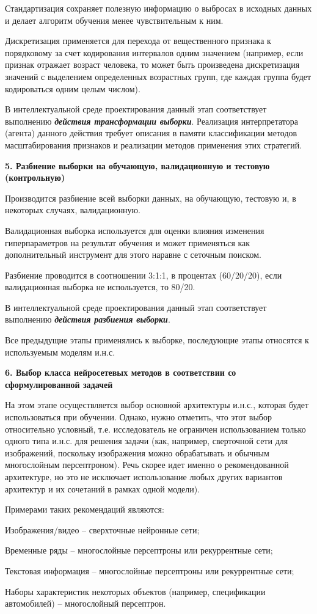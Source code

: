 Стандартизация сохраняет полезную информацию о выбросах в исходных данных и делает алгоритм обучения менее чувствительным к ним.

Дискретизация применяется для перехода от вещественного признака к порядковому за счет кодирования интервалов одним значением (например, если признак отражает возраст человека, то может быть произведена дискретизация значений с выделением определенных возрастных групп, где каждая группа будет кодироваться одним целым числом).

В интеллектуальной среде проектирования данный этап соответствует выполнению \textbf{\textit{действия трансформации выборки}}. Реализация интерпретатора (агента) данного действия требует описания в памяти классификации методов масштабирования признаков и реализации методов применения этих стратегий.


\textbf{5. Разбиение выборки на обучающую, валидационную и тестовую (контрольную)}

Производится разбиение всей выборки данных, на обучающую, тестовую и, в некоторых случаях, валидационную.

Валидационная выборка используется для оценки влияния изменения гиперпараметров на результат обучения и может применяться как дополнительный инструмент для этого наравне с сеточным поиском.

Разбиение проводится в соотношении 3:1:1, в процентах (60/20/20), если валидационная выборка не используется, то 80/20.

В интеллектуальной среде проектирования данный этап соответствует выполнению \textbf{\textit{действия разбиения выборки}}.

Все предыдущие этапы применялись к выборке, последующие этапы относятся к используемым моделям и.н.с.


\textbf{6. Выбор класса нейросетевых методов в соответствии со сформулированной задачей}

На этом этапе осуществляется выбор основной архитектуры и.н.с., которая будет использоваться при обучении. Однако, нужно отметить, что этот выбор относительно условный, т.е. исследователь не ограничен использованием только одного типа и.н.с. для решения задачи (как, например, сверточной сети для изображений, поскольку изображения можно обрабатывать и обычным многослойным персептроном). Речь скорее идет именно о рекомендованной архитектуре, но это не исключает использование любых других вариантов архитектур и их сочетаний в рамках одной модели).

Примерами таких рекомендаций являются:
\begin{textitemize}
	\item Изображения/видео -- сверхточные нейронные сети;
	\item Временные ряды -- многослойные персептроны или рекуррентные сети;
	\item Текстовая информация -- многослойные персептроны или рекуррентные сети;
	\item Наборы характеристик некоторых объектов (например, спецификации автомобилей) -- многослойный персептрон.
\end{textitemize}

